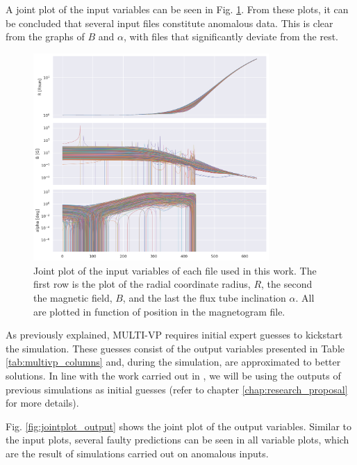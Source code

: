 A joint plot of the input variables can be seen in Fig. \ref{fig:jointplot_input}. From these plots, it can be concluded that several input files constitute anomalous data. This is clear from the graphs of $B$ and $\alpha$, with files that significantly deviate from the rest.


\begin{figure}[h]
    \centering
    \includegraphics[width=0.8\textwidth]{figures/joint_input_cols.png}
    \caption{Joint plot of the input variables of each file used in this work. The first row is the plot of the radial coordinate radius, $R$, the second the magnetic field, $B$, and the last the flux tube inclination $\alpha$. All are plotted in function of position in the magnetogram file.}
    \label{fig:jointplot_input}
\end{figure}

As previously explained, MULTI-VP requires initial expert guesses to kickstart the simulation. These guesses consist of the output variables presented in Table \ref{tab:multivp_columns} and, during the simulation, are approximated to better solutions. In line with the work carried out in \cite{barros_InitialConditionEstimation_}, we will be using the outputs of previous simulations as initial guesses (refer to chapter \ref{chap:research_proposal} for more details).


Fig. \ref{fig:jointplot_output} shows the joint plot of the output variables. Similar to the input plots, several faulty predictions can be seen in all variable plots, which are the result of simulations carried out on anomalous inputs.

